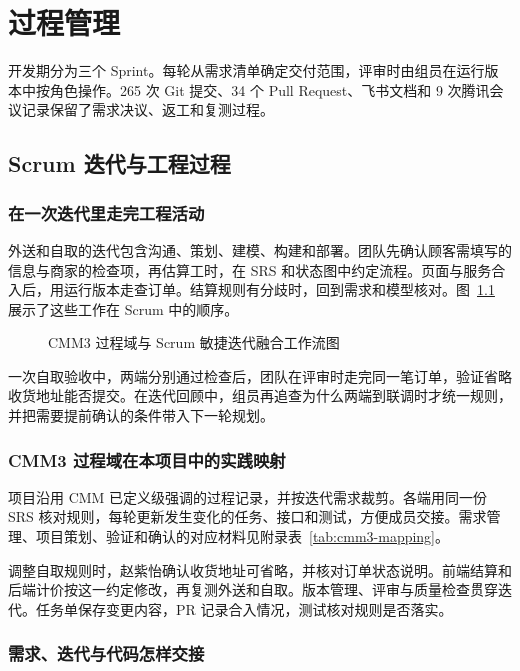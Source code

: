 \chapter{过程管理}\label{chap:process}

开发期分为三个 Sprint。每轮从需求清单确定交付范围，评审时由组员在运行版本中按角色操作。265 次 Git 提交、34 个 Pull Request、飞书文档和 9 次腾讯会议记录保留了需求决议、返工和复测过程。

\section{Scrum 迭代与工程过程}

\subsection{在一次迭代里走完工程活动}

外送和自取的迭代包含沟通、策划、建模、构建和部署。团队先确认顾客需填写的信息与商家的检查项，再估算工时，在 SRS 和状态图中约定流程。页面与服务合入后，用运行版本走查订单。结算规则有分歧时，回到需求和模型核对。图~\ref{fig:proc-workflow} 展示了这些工作在 Scrum 中的顺序。

\begin{figure}[!htbp]
  \centering
  \resizebox{.92\linewidth}{!}{}
  \caption{CMM3 过程域与 Scrum 敏捷迭代融合工作流图}\label{fig:proc-workflow}
\end{figure}

一次自取验收中，两端分别通过检查后，团队在评审时走完同一笔订单，验证省略收货地址能否提交。在迭代回顾中，组员再追查为什么两端到联调时才统一规则，并把需要提前确认的条件带入下一轮规划。

\subsection{CMM3 过程域在本项目中的实践映射}

项目沿用 CMM 已定义级强调的过程记录，并按迭代需求裁剪。各端用同一份 SRS 核对规则，每轮更新发生变化的任务、接口和测试，方便成员交接。需求管理、项目策划、验证和确认的对应材料见附录表~\ref{tab:cmm3-mapping}。

调整自取规则时，赵紫怡确认收货地址可省略，并核对订单状态说明。前端结算和后端计价按这一约定修改，再复测外送和自取。版本管理、评审与质量检查贯穿迭代。任务单保存变更内容，PR 记录合入情况，测试核对规则是否落实。

\subsection{需求、迭代与代码怎样交接}

